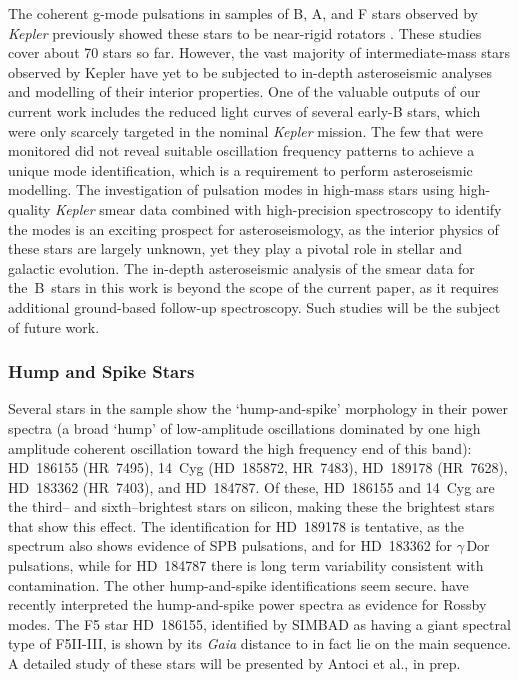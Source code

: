 \documentclass[a4paper,fleqn,usenatbib]{mnras}
\newcommand{\kepler}{\emph{Kepler}\xspace}
\newcommand{\gaia}{\emph{Gaia}\xspace}
\begin{document}
The coherent g-mode pulsations in samples of B, A, and F stars observed by \kepler previously showed these stars to be near-rigid rotators \citep{kurtz2014,saio15,triana15,vanreeth15,vanreeth16,vanreeth18,murphy16,schmid16,moravveji16,ouazzani17,papics17,aerts17,szewczuk18,2018arXiv180907779A}. These studies cover about 70 stars so far. However, the vast majority of intermediate-mass stars observed by Kepler have yet to be subjected to in-depth asteroseismic analyses and modelling of their interior properties. One of the valuable outputs of our current work includes the reduced light curves of several early-B stars, which were only scarcely targeted in the nominal \kepler mission. The few that were monitored did not reveal suitable oscillation frequency patterns to achieve a unique mode identification, which is a requirement to perform asteroseismic modelling. The investigation of pulsation modes in high-mass stars using high-quality \kepler smear data combined with high-precision spectroscopy to identify the modes \citep[Chapter 6]{aertsbook} is an exciting prospect for asteroseismology, as the interior physics of these stars are largely unknown, yet they play a pivotal role in stellar and galactic evolution. The in-depth asteroseismic analysis of the smear data for the~B~stars in this work is beyond the scope of the current paper, as it requires additional ground-based follow-up spectroscopy. Such studies will be the subject of future work.

\subsubsection{Hump and Spike Stars}
\label{hs}

Several stars in the sample show the `hump-and-spike' morphology in their power spectra (a broad `hump' of low-amplitude oscillations dominated by one high amplitude coherent oscillation toward the high frequency end of this band): HD~186155 (HR~7495), 14~Cyg (HD~185872, HR~7483), HD~189178 (HR~7628), HD~183362 (HR~7403), and HD~184787. Of these, HD~186155 and 14~Cyg are the third-- and sixth--brightest stars on silicon, making these the brightest stars that show this effect. The identification for HD~189178 is tentative, as the spectrum also shows evidence of SPB pulsations, and for HD~183362 for $\gamma$\,Dor pulsations, while for HD~184787 there is long term variability consistent with contamination. The other hump-and-spike identifications seem secure. \citet{2018MNRAS.474.2774S} have recently interpreted the hump-and-spike power spectra as evidence for Rossby modes. The F5 star HD~186155, identified by SIMBAD as having a giant spectral type of F5II-III, is shown by its \gaia distance to in fact lie on the main sequence. A detailed study of these stars will be presented by Antoci et al., in prep.
\end{document}
